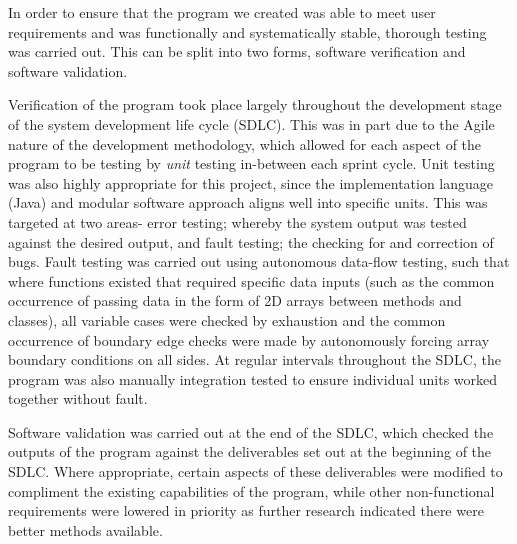 \documentclass[12pt,a4paper]{article}
\begin{document}






In order to ensure that the program we created was able to meet user requirements and was functionally and systematically stable, thorough testing was carried out. This can be split into two forms, software verification and software validation.

Verification of the program took place largely throughout the development stage of the system development life cycle (SDLC). This was in part due to the Agile nature of the development methodology, which allowed for each aspect of the program to be testing by \emph{unit} testing in-between each sprint cycle. Unit testing was also highly appropriate for this project, since the implementation language (Java) and modular software approach aligns well into specific units. This was targeted at two areas- error testing; whereby the system output was tested against the desired output, and fault testing; the checking for and correction of bugs. Fault testing was carried out using autonomous data-flow testing, such that where functions existed that required specific data inputs (such as the common occurrence of passing data in the form of 2D arrays between methods and classes), all variable cases were checked by exhaustion and the common occurrence of boundary edge checks were made by autonomously forcing array boundary conditions on all sides. At regular intervals throughout the SDLC, the program was also manually integration tested to ensure individual units worked together without fault.

Software validation was carried out at the end of the SDLC, which checked the outputs of the program against the deliverables set out at the beginning of the SDLC. Where appropriate, certain aspects of these deliverables were modified to compliment the existing capabilities of the program, while other non-functional requirements were lowered in priority as further research indicated there were better methods available. 
\end{document}
